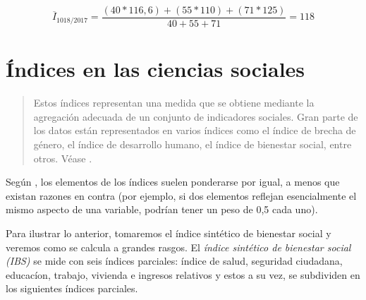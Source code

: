 \documentclass[
]{book}
\begin{document}
\[\overline{I}_{1018/2017}=\frac{(40*116,6)+(55*110)+(71*125)}{40+55+71}=118\]

\hypertarget{uxedndices-en-las-ciencias-sociales}{%
\section{Índices en las ciencias sociales}\label{uxedndices-en-las-ciencias-sociales}}

\begin{quote}
Estos índices representan una medida que se obtiene mediante la agregación adecuada de un conjunto de indicadores sociales. Gran parte de los datos están representados en varios índices como el índice de brecha de género, el índice de desarrollo humano, el índice de bienestar social, entre otros. Véase \citet{foa2015indices}.
\end{quote}

Según \citet{babbie2020practice}, los elementos de los índices suelen ponderarse por igual, a menos que existan razones en contra (por ejemplo, si dos elementos reflejan esencialmente el mismo aspecto de una variable, podrían tener un peso de 0,5 cada uno).

Para ilustrar lo anterior, tomaremos el índice sintético de bienestar social y veremos como se calcula a grandes rasgos. El \emph{índice sintético de bienestar social (IBS)} se mide con seis índices parciales: índice de salud, seguridad ciudadana, educacíon, trabajo, vivienda e ingresos relativos y estos a su vez, se subdividen en los siguientes índices parciales.
\end{document}

